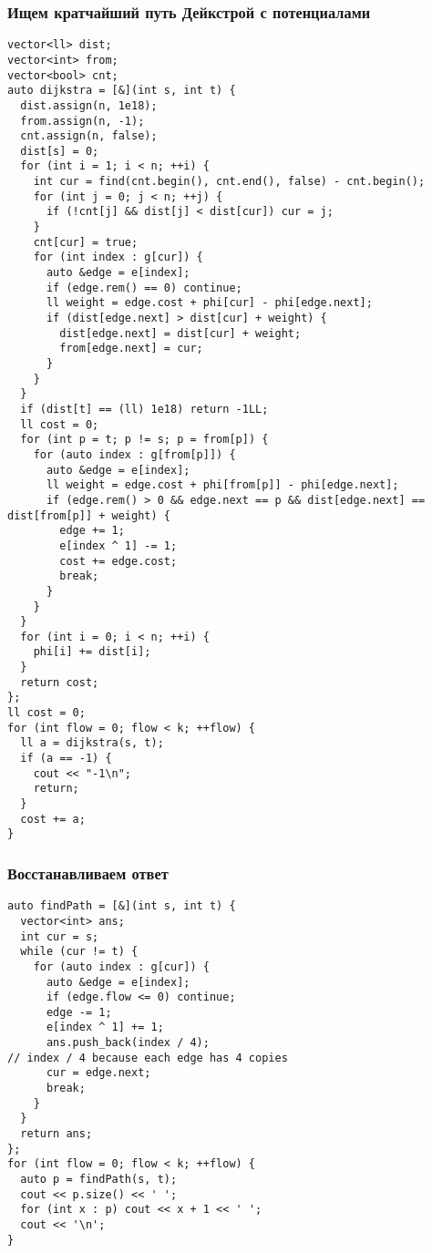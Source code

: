 \subsubsection{Ищем кратчайший путь Дейкстрой с потенциалами}
\begin{lstlisting}
vector<ll> dist;
vector<int> from;
vector<bool> cnt;
auto dijkstra = [&](int s, int t) {
  dist.assign(n, 1e18);
  from.assign(n, -1);
  cnt.assign(n, false);
  dist[s] = 0;
  for (int i = 1; i < n; ++i) {
    int cur = find(cnt.begin(), cnt.end(), false) - cnt.begin();
    for (int j = 0; j < n; ++j) {
      if (!cnt[j] && dist[j] < dist[cur]) cur = j;
    }
    cnt[cur] = true;
    for (int index : g[cur]) {
      auto &edge = e[index];
      if (edge.rem() == 0) continue;
      ll weight = edge.cost + phi[cur] - phi[edge.next];
      if (dist[edge.next] > dist[cur] + weight) {
        dist[edge.next] = dist[cur] + weight;
        from[edge.next] = cur;
      }
    }
  }
  if (dist[t] == (ll) 1e18) return -1LL;
  ll cost = 0;
  for (int p = t; p != s; p = from[p]) {
    for (auto index : g[from[p]]) {
      auto &edge = e[index];
      ll weight = edge.cost + phi[from[p]] - phi[edge.next];
      if (edge.rem() > 0 && edge.next == p && dist[edge.next] == dist[from[p]] + weight) {
        edge += 1;
        e[index ^ 1] -= 1;
        cost += edge.cost;
        break;
      }
    }
  }
  for (int i = 0; i < n; ++i) {
    phi[i] += dist[i];
  }
  return cost;
};
ll cost = 0;
for (int flow = 0; flow < k; ++flow) {
  ll a = dijkstra(s, t);
  if (a == -1) {
    cout << "-1\n";
    return;
  }
  cost += a;
}
\end{lstlisting}
\subsubsection{Восстанавливаем ответ}
\begin{lstlisting}
auto findPath = [&](int s, int t) {
  vector<int> ans;
  int cur = s;
  while (cur != t) {
    for (auto index : g[cur]) {
      auto &edge = e[index];
      if (edge.flow <= 0) continue;
      edge -= 1;
      e[index ^ 1] += 1;
      ans.push_back(index / 4);
// index / 4 because each edge has 4 copies
      cur = edge.next;
      break;
    }
  }
  return ans;
};
for (int flow = 0; flow < k; ++flow) {
  auto p = findPath(s, t);
  cout << p.size() << ' ';
  for (int x : p) cout << x + 1 << ' ';
  cout << '\n';
}
\end{lstlisting}